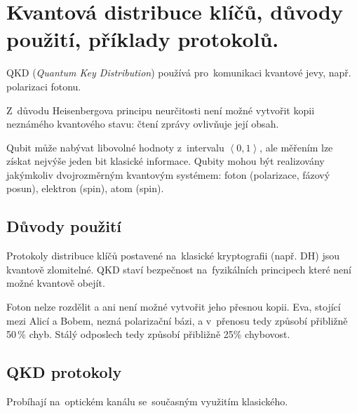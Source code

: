 \clearpage
\section{Kvantová distribuce klíčů, důvody použití, příklady protokolů.}

QKD (\emph{Quantum Key Distribution}) používá pro~komunikaci kvantové jevy, např. polarizaci fotonu.

Z~důvodu Heisenbergova principu neurčitosti není možné vytvořit kopii neznámého kvantového stavu: čtení zprávy ovlivňuje její obsah.

Qubit může nabývat libovolné hodnoty z~intervalu $\left<0,1\right>$, ale měřením lze získat nejvýše jeden bit klasické informace.
Qubity mohou být realizovány jakýmkoliv dvojrozměrným kvantovým systémem: foton (polarizace, fázový posun), elektron (spin), atom (spin).


\subsection{Důvody použití}

Protokoly distribuce klíčů postavené na~klasické kryptografii (např. DH) jsou kvantově zlomitelné.
QKD staví bezpečnost na~fyzikálních principech které není možné kvantově obejít.

Foton nelze rozdělit a ani není možné vytvořit jeho přesnou kopii.
Eva, stojící mezi Alicí a Bobem, nezná polarizační bázi, a v~přenosu tedy způsobí přibližně 50\,\% chyb.
Stálý odposlech tedy způsobí přibližně 25\% chybovost.


\subsection{QKD protokoly}

Probíhají na~optickém kanálu se~současným využitím klasického.

